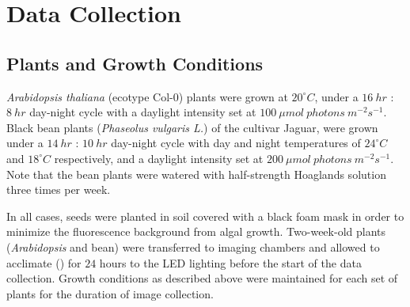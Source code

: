 \section{Data Collection}
\label{sec:2}

\subsection{Plants and Growth Conditions}

{\it Arabidopsis thaliana} (ecotype Col-$0$) plants were grown at $20^{\circ}C$, under a $16~hr$ : $8~hr$ day-night cycle with a daylight intensity set at $100~\mu mol~photons~m^{-2} s^{-1}$.
%
Black bean plants ({\it Phaseolus vulgaris L.}) of the cultivar Jaguar, were grown under a $14~hr$ : $10~hr$ day-night cycle with day and night temperatures of $24^{\circ}C$ and $18^{\circ}C$ respectively, and a daylight intensity set at $200~\mu mol~photons~m^{-2} s^{-1}$.
%
Note that the bean plants were watered with half-strength Hoaglands solution three times per week.

In all cases, seeds were planted in soil covered with a black foam mask in order to minimize the fluorescence background from algal growth.
%
Two-week-old plants ({\it Arabidopsis} and bean) were transferred to imaging chambers and allowed to acclimate () for $24$ hours to the LED lighting before the start of the data collection.
Growth conditions as described above were maintained for each set of plants for the duration of image collection.
